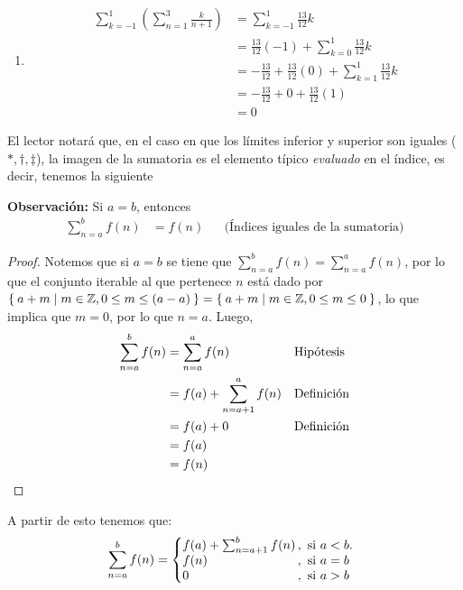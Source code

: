 \begin{enumerate}
  \item \begin{align*}
    \sum_{k=-1}^{1} \left(\sum_{n=1}^{3} \frac{k}{n+1}\right) &= \sum_{k=-1}^{1} \frac{13}{12}k\\
    &= \frac{13}{12} (-1) + \sum_{k=0}^{1} \frac{13}{12}k\\
    &= - \frac{13}{12} + \frac{13}{12} (0) + \sum_{k=1}^{1} \frac{13}{12}k\\
    &= - \frac{13}{12} + 0 + \frac{13}{12} (1)\\
    &= 0
  \end{align*}
\end{enumerate}


  El lector notará que, en el caso en que los límites inferior y superior son iguales ($*, \dag, \ddag$), la imagen de la sumatoria es el elemento típico \textit{evaluado} en el índice, es decir, tenemos la siguiente

  \textbf{Observación:} Si $a=b$, entonces
  \begin{align*}
    \sum_{n=a}^{b} f(n) &= f(n) && \text{(Índices iguales de la sumatoria)}
  \end{align*}
  
  \begin{proof}\leavevmode
    Notemos que si $a=b$ se tiene que $\sum_{n=a}^{b} f(n) = \sum_{n=a}^{a} f(n)$, por lo que el conjunto iterable al que pertenece $n$ está dado por $\Set{a+m|m\in \mathbb{Z}, 0\leq m\leq (a-a)}=\Set{a+m|m\in \mathbb{Z}, 0\leq m\leq 0}$, lo que implica que $m=0$, por lo que $n=a$. Luego,
    \begin{align*}
      \sum_{n=a}^{b} f(n) &= \sum_{n=a}^{a} f(n) && \text{Hipótesis}\\
      &= f(a) + \sum_{n=a+1}^{a} f(n) && \text{Definición}\\
      &= f(a) + 0 && \text{Definición}\\
      &= f(a)\\
      &= f(n) && \qedhere
    \end{align*}
  \end{proof}

  A partir de esto tenemos que:
  \[
    \sum_{n=a}^{b} f(n) = \left\{
    \begin{array}{@{}l@{\thinspace}l}
    f(a) + \sum_{n=a+1}^{b} f(n) &,  \ \text{si}  \ a<b.\\
    f(n) &,  \ \text{si}  \ a=b\\
    0 &,  \ \text{si}  \ a>b
    \end{array} \right. \]

